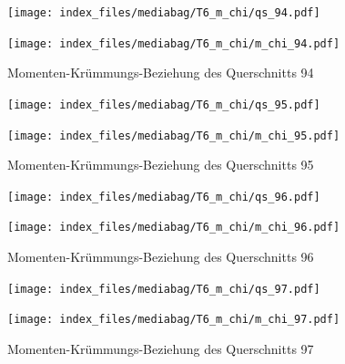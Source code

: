 \documentclass[
  11pt,
  letterpaper,
]{scrreprt}
\begin{document}
\begin{figure}[H]

\begin{minipage}{0.50\linewidth}
\texttt{[image: index\_files/mediabag/T6\_m\_chi/qs\_94.pdf]}\end{minipage}%
%
\begin{minipage}{0.50\linewidth}
\texttt{[image: index\_files/mediabag/T6\_m\_chi/m\_chi\_94.pdf]}\end{minipage}%

\caption{\label{fig-mchi_anhang}Momenten-Krümmungs-Beziehung des
Querschnitts 94}

\end{figure}%

\begin{figure}[H]

\begin{minipage}{0.50\linewidth}
\texttt{[image: index\_files/mediabag/T6\_m\_chi/qs\_95.pdf]}\end{minipage}%
%
\begin{minipage}{0.50\linewidth}
\texttt{[image: index\_files/mediabag/T6\_m\_chi/m\_chi\_95.pdf]}\end{minipage}%

\caption{\label{fig-mchi_anhang}Momenten-Krümmungs-Beziehung des
Querschnitts 95}

\end{figure}%

\begin{figure}[H]

\begin{minipage}{0.50\linewidth}
\texttt{[image: index\_files/mediabag/T6\_m\_chi/qs\_96.pdf]}\end{minipage}%
%
\begin{minipage}{0.50\linewidth}
\texttt{[image: index\_files/mediabag/T6\_m\_chi/m\_chi\_96.pdf]}\end{minipage}%

\caption{\label{fig-mchi_anhang}Momenten-Krümmungs-Beziehung des
Querschnitts 96}

\end{figure}%

\begin{figure}[H]

\begin{minipage}{0.50\linewidth}
\texttt{[image: index\_files/mediabag/T6\_m\_chi/qs\_97.pdf]}\end{minipage}%
%
\begin{minipage}{0.50\linewidth}
\texttt{[image: index\_files/mediabag/T6\_m\_chi/m\_chi\_97.pdf]}\end{minipage}%

\caption{\label{fig-mchi_anhang}Momenten-Krümmungs-Beziehung des
Querschnitts 97}

\end{figure}%
\end{document}
